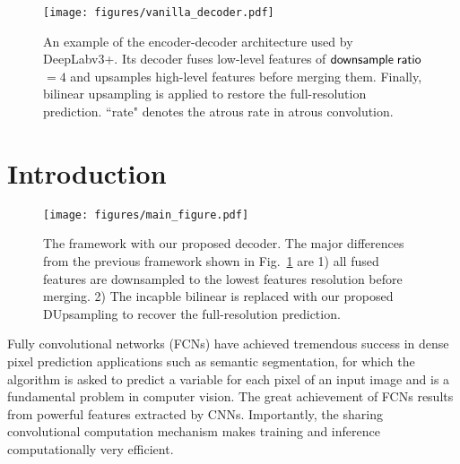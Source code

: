 \documentclass[10pt,twocolumn,letterpaper]{article}
\newcommand{\1}{{\mathbbm{1}}}
\begin{document}
\begin{figure}[t!]
  \centering
  \texttt{[image: figures/vanilla\_decoder.pdf]}
  \caption{An example of the encoder-decoder architecture used by DeepLabv3+. Its decoder fuses low-level features of ${\sf downsample\; ratio}$ $= 4$ and upsamples high-level features before merging them. Finally, bilinear upsampling is applied to restore the full-resolution prediction. ``rate" denotes the atrous rate in atrous convolution.
}
  \label{fig:vanilla_decoder}
\end{figure}





\section{Introduction}
\begin{figure*}[t]
  \centering
  \texttt{[image: figures/main\_figure.pdf]}
  \caption{The framework with our proposed decoder. The major differences from the previous framework shown in Fig.~\ref{fig:vanilla_decoder} are 1) all fused features are downsampled to the lowest features resolution before merging. 2) The incapble bilinear is replaced with our proposed DUpsampling to recover the full-resolution prediction. }
  \vspace{-0.5cm}
  \label{fig:main_figure}
\end{figure*}



Fully convolutional networks (FCNs) \cite{long2015fully} have achieved tremendous success in dense pixel prediction applications such as  semantic segmentation, for which the algorithm is asked to predict a variable for each pixel of an input image and is a fundamental problem in computer vision. The great achievement of FCNs results from powerful features extracted by  CNNs. Importantly, the sharing convolutional computation mechanism makes training and inference computationally very efficient.
\end{document}
